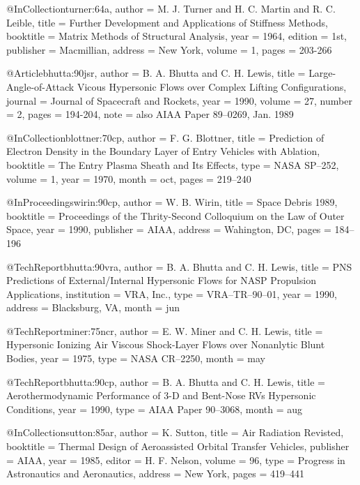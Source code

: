 @InCollection{turner:64a,
  author = 	 {M. J. Turner and H. C. Martin and R. C. Leible},
  title = 	 {Further Development and Applications of Stiffness Methods},
  booktitle = 	 {Matrix Methods of Structural Analysis},
  year = 	 1964,
  edition =      {1st},
  publisher =    {Macmillian},
  address =      {New York},
  volume =	 1,
  pages =	 {203-266}
  }

@Article{bhutta:90jsr,
  author = 	 {B. A. Bhutta and C. H. Lewis},
  title = 	 {Large-Angle-of-Attack Vicous Hypersonic Flows over
                  Complex Lifting Configurations},
  journal = 	 {Journal of Spacecraft and Rockets},
  year = 	 1990,
  volume =	 27,
  number =	 2,
  pages =	 {194-204},
  note =	 {also AIAA Paper 89--0269, Jan. 1989}
}

@InCollection{blottner:70cp,
  author = 	 {F. G. Blottner},
  title = 	 {Prediction of Electron Density in the Boundary Layer
                  of Entry Vehicles with Ablation},
  booktitle = 	 {The Entry Plasma Sheath and Its Effects},
  type =         {NASA SP--252},
  volume =	 1,
  year =	 1970,
  month =	 oct,
  pages =	 {219--240}
}

@InProceedings{wirin:90cp,
  author = 	 {W. B. Wirin},
  title = 	 {Space Debris 1989},
  booktitle = 	 {Proceedings of the Thrity-Second Colloquium
                 on the Law of Outer Space},
  year =	 1990,
  publisher =	 {AIAA},
  address =	 {Wahington, DC},
  pages =	 {184--196}
}

@TechReport{bhutta:90vra,
  author = 	 {B. A. Bhutta and C. H. Lewis},
  title = 	 {PNS Predictions of External/Internal Hypersonic Flows
                  for NASP Propulsion Applications},
  institution =  {VRA, Inc.},
  type =         {VRA--TR--90--01},
  year = 	 1990,
  address =	 {Blacksburg, VA},
  month =	 jun
}

@TechReport{miner:75ncr,
  author = 	 {E. W. Miner and C. H. Lewis},
  title = 	 {Hypersonic Ionizing Air Viscous Shock-Layer Flows
                  over Nonanlytic Blunt Bodies},
  year = 	 1975,
  type =	 {NASA CR--2250},
  month =	 may
}

@TechReport{bhutta:90cp,
  author = 	 {B. A. Bhutta and C. H. Lewis},
  title = 	 {Aerothermodynamic Performance of 3-D and Bent-Nose RVs
                  Hypersonic Conditions},
  year = 	 1990,
  type =	 {AIAA Paper 90--3068},
  month =	 aug
}

@InCollection{sutton:85ar,
  author = 	 {K. Sutton},
  title = 	 {Air Radiation Revisted},
  booktitle = 	 {Thermal Design of Aeroassisted Orbital Transfer Vehicles},
  publisher =	 {AIAA},
  year =	 1985,
  editor =	 {H. F. Nelson},
  volume =	 96,
  type =	 {Progress in Astronautics and Aeronautics},
  address =	 {New York},
  pages =	 {419--441}
}

